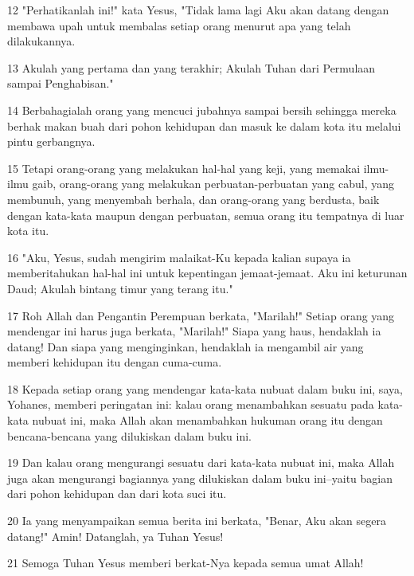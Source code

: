 \par 12 "Perhatikanlah ini!" kata Yesus, "Tidak lama lagi Aku akan datang dengan membawa upah untuk membalas setiap orang menurut apa yang telah dilakukannya.
\par 13 Akulah yang pertama dan yang terakhir; Akulah Tuhan dari Permulaan sampai Penghabisan."
\par 14 Berbahagialah orang yang mencuci jubahnya sampai bersih sehingga mereka berhak makan buah dari pohon kehidupan dan masuk ke dalam kota itu melalui pintu gerbangnya.
\par 15 Tetapi orang-orang yang melakukan hal-hal yang keji, yang memakai ilmu-ilmu gaib, orang-orang yang melakukan perbuatan-perbuatan yang cabul, yang membunuh, yang menyembah berhala, dan orang-orang yang berdusta, baik dengan kata-kata maupun dengan perbuatan, semua orang itu tempatnya di luar kota itu.
\par 16 "Aku, Yesus, sudah mengirim malaikat-Ku kepada kalian supaya ia memberitahukan hal-hal ini untuk kepentingan jemaat-jemaat. Aku ini keturunan Daud; Akulah bintang timur yang terang itu."
\par 17 Roh Allah dan Pengantin Perempuan berkata, "Marilah!" Setiap orang yang mendengar ini harus juga berkata, "Marilah!" Siapa yang haus, hendaklah ia datang! Dan siapa yang menginginkan, hendaklah ia mengambil air yang memberi kehidupan itu dengan cuma-cuma.
\par 18 Kepada setiap orang yang mendengar kata-kata nubuat dalam buku ini, saya, Yohanes, memberi peringatan ini: kalau orang menambahkan sesuatu pada kata-kata nubuat ini, maka Allah akan menambahkan hukuman orang itu dengan bencana-bencana yang dilukiskan dalam buku ini.
\par 19 Dan kalau orang mengurangi sesuatu dari kata-kata nubuat ini, maka Allah juga akan mengurangi bagiannya yang dilukiskan dalam buku ini--yaitu bagian dari pohon kehidupan dan dari kota suci itu.
\par 20 Ia yang menyampaikan semua berita ini berkata, "Benar, Aku akan segera datang!" Amin! Datanglah, ya Tuhan Yesus!
\par 21 Semoga Tuhan Yesus memberi berkat-Nya kepada semua umat Allah!


